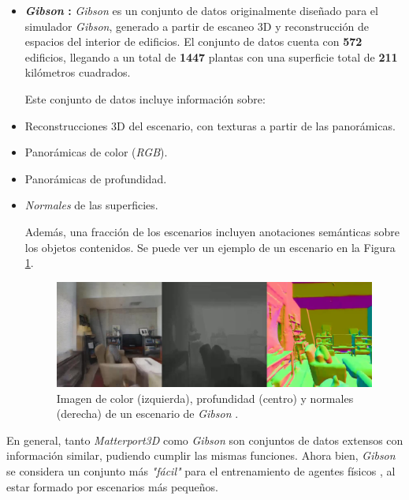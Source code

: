 \begin{itemize}
	\item \textbf{\textit{Gibson} \cite{xiazamirhe2018gibsonenv}:}	\textit{Gibson} es un conjunto de datos originalmente diseñado para el simulador \textit{Gibson}, generado a partir de escaneo 3D y reconstrucción de espacios del interior de edificios. El conjunto de datos cuenta con \textbf{572} edificios, llegando a un total de \textbf{1447} plantas con una superficie total de \textbf{211} kilómetros cuadrados.
	
	Este conjunto de datos incluye información sobre:
	\item Reconstrucciones 3D del escenario, con texturas a partir de las panorámicas.
		\item Panorámicas de color (\textit{RGB}).
		\item Panorámicas de profundidad.
		\item \textit{Normales} de las superficies.
		
	Además, una fracción de los escenarios incluyen anotaciones semánticas sobre los objetos contenidos. Se puede ver un ejemplo de un escenario en la Figura \ref{fig:chap4-gibson}.

\begin{figure}[h]
    \centering
    \includegraphics[width=\textwidth]{imagenes/cap4/gibson.jpg}
    \caption{Imagen de color (izquierda), profundidad (centro) y normales (derecha) de un escenario de \textit{Gibson} \cite{xiazamirhe2018gibsonenv}.}
    \label{fig:chap4-gibson}
\end{figure}

\end{itemize}

En general, tanto \textit{Matterport3D} como \textit{Gibson} son conjuntos de datos extensos con información similar, pudiendo cumplir las mismas funciones. Ahora bien, \textit{Gibson} se considera un conjunto más \textit{"fácil"} para el entrenamiento de agentes físicos \cite{habitat19iccv}, al estar formado por escenarios más pequeños.

